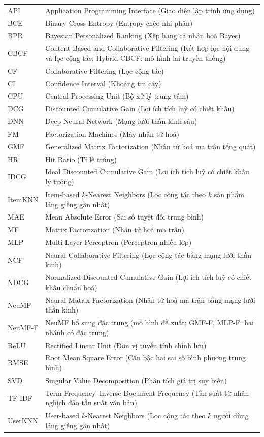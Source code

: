{
\renewcommand{\arraystretch}{1.4}
\setlength{\LTleft}{0pt}
\begin{longtable}{p{2.5cm} p{11.5cm}}
API & Application Programming Interface (Giao diện lập trình ứng dụng) \\
BCE & Binary Cross-Entropy (Entropy chéo nhị phân) \\
BPR & Bayesian Personalized Ranking (Xếp hạng cá nhân hoá Bayes) \\
CBCF & Content-Based and Collaborative Filtering (Kết hợp lọc nội dung và lọc cộng tác; Hybrid-CBCF: mô hình lai truyền thống) \\
CF & Collaborative Filtering (Lọc cộng tác) \\
CI & Confidence Interval (Khoảng tin cậy) \\
CPU & Central Processing Unit (Bộ xử lý trung tâm) \\
DCG & Discounted Cumulative Gain (Lợi ích tích luỹ có chiết khấu) \\
DNN & Deep Neural Network (Mạng lưới thần kinh sâu) \\
FM & Factorization Machines (Máy nhân tử hoá) \\
GMF & Generalized Matrix Factorization (Nhân tử hoá ma trận tổng quát) \\
HR & Hit Ratio (Tỉ lệ trúng) \\
IDCG & Ideal Discounted Cumulative Gain (Lợi ích tích luỹ có chiết khấu lý tưởng) \\
ItemKNN & Item-based $k$-Nearest Neighbors (Lọc cộng tác theo $k$ sản phẩm láng giềng gần nhất) \\
MAE & Mean Absolute Error (Sai số tuyệt đối trung bình) \\
MF & Matrix Factorization (Nhân tử hoá ma trận) \\
MLP & Multi-Layer Perceptron (Perceptron nhiều lớp) \\
NCF & Neural Collaborative Filtering (Lọc cộng tác bằng mạng lưới thần kinh) \\
NDCG & Normalized Discounted Cumulative Gain (Lợi ích tích luỹ có chiết khấu chuẩn hoá) \\
NeuMF & Neural Matrix Factorization (Nhân tử hoá ma trận bằng mạng lưới thần kinh) \\
NeuMF-F & NeuMF bổ sung đặc trưng (mô hình đề xuất; GMF-F, MLP-F: hai nhánh có đặc trưng) \\
ReLU & Rectified Linear Unit (Đơn vị tuyến tính chỉnh lưu) \\
RMSE & Root Mean Square Error (Căn bậc hai sai số bình phương trung bình) \\
SVD & Singular Value Decomposition (Phân tích giá trị suy biến) \\
TF-IDF & Term Frequency--Inverse Document Frequency (Tần suất từ nhân nghịch đảo tần suất văn bản) \\
UserKNN & User-based $k$-Nearest Neighbors (Lọc cộng tác theo $k$ người dùng láng giềng gần nhất) \\
\end{longtable}
} 
\clearpage
